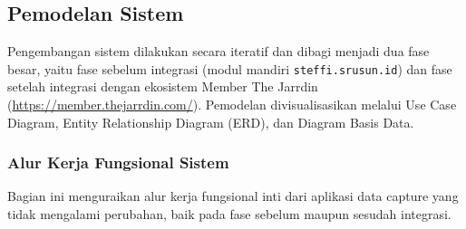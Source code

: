     
\subsection{Pemodelan Sistem}
Pengembangan sistem dilakukan secara iteratif dan dibagi menjadi dua fase besar, yaitu fase sebelum integrasi (modul mandiri \texttt{steffi.srusun.id}) dan fase setelah integrasi dengan ekosistem {Member} The Jarrdin (\url{https://member.thejarrdin.com/}). Pemodelan divisualisasikan melalui {Use Case Diagram}, {Entity Relationship Diagram} (ERD), dan Diagram Basis Data.


\subsubsection{Alur Kerja Fungsional Sistem}
Bagian ini menguraikan alur kerja fungsional inti dari aplikasi {data capture} yang tidak mengalami perubahan, baik pada fase sebelum maupun sesudah integrasi.

